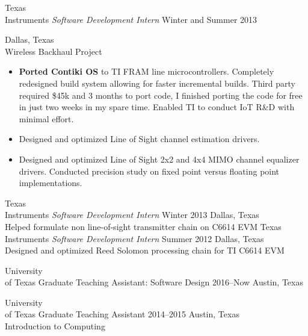 \documentclass[]{friggeri-cv} %
\begin{document}
\begin{entrylist}
\entry
{Texas \\ Instruments}
{\emph{Software Development Intern}}
{Winter and Summer 2013}
{Dallas, Texas \\ Wireless Backhaul Project
	\begin{itemize}
	\item \textbf{Ported Contiki OS} to TI FRAM line microcontrollers. Completely redesigned build system allowing for faster incremental builds. Third party required \$45k and 3 months to port code, I finished porting the code for free in just two weeks in my spare time. Enabled TI to conduct IoT R\&D with minimal effort.  
	\item Designed and optimized Line of Sight channel estimation drivers.
	\item Designed and optimized Line of Sight 2x2 and 4x4 MIMO channel equalizer drivers. Conducted precision study on fixed point versus floating point implementations.

\end{itemize}}
\entry
{Texas\\  Instruments}
{\emph{Software Development Intern}}
{Winter 2013}
{Dallas, Texas \\
Helped formulate non line-of-sight transmitter chain on C6614 EVM
}
\entry
{Texas \\ Instruments}
{\emph{Software Development Intern}}
{Summer 2012}
{Dallas, Texas \\
Designed and optimized Reed Solomon processing chain for TI C6614 EVM 
}


\entry
{University \\ of Texas}
{Graduate Teaching Assistant: Software Design }
{2016--Now}
{Austin, Texas}


\entry
{University \\ of Texas}
{Graduate Teaching Assistant}
{2014--2015}
{Austin, Texas \\
Introduction to Computing }






\end{entrylist}
\end{document}
